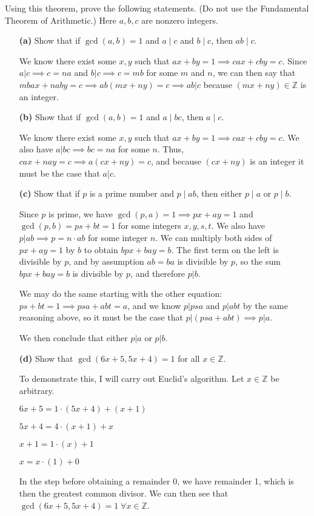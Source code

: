 \documentclass[12pt]{amsart}
\def\ZZ{{\mathbb Z}}
\begin{document}
Using this theorem, prove the following statements. (Do not use the Fundamental Theorem of Arithmetic.)  Here $a,b,c$ are nonzero integers.
\begin{itemize}
	\item[{\bf (a)}]  Show that if $\gcd(a,b)=1$ and $a\mid c$ and $b\mid c$, then $ab\mid c$.
	
	\medskip
	
	We know there exist some $x, y$ such that $ax + by = 1 \implies cax + cby = c$. Since $a|c \implies c = na$ and $b | c \implies c = mb$ for some $m$ and $n$, we can then say that $mbax + naby = c \implies ab(mx + ny) = c \implies ab | c$ because $(mx+ny)\in\ZZ$ is an integer. 	
	
	\medskip	
	
	
	\item[{\bf (b)}]  Show that if $\gcd(a,b)=1$ and $a\mid bc$, then $a\mid c$. 
	\medskip
	
	We know there exist some $x, y$ such that $ax + by = 1 \implies cax + cby = c$. We also have $a | bc \implies bc = na$ for some $n$. Thus, $cax + nay = c \implies a(cx + ny) = c$, and because $(cx + ny)$ is an integer it must be the case that $a | c$.
	
	\medskip	
	\item[{\bf (c)}]  Show that if $p$ is a prime number and $p\mid ab$, then either $p\mid a$ or $p\mid b$. 
	\medskip
	
	Since $p$ is prime, we have $\gcd(p, a) = 1 \implies px + ay = 1$ and $\gcd(p, b) = ps + bt = 1$ for some integers $x, y, s, t$. We also have $p | ab \implies p=n\cdot ab$ for some integer $n$. We can multiply both sides of $px + ay = 1$ by $b$ to obtain $bpx + bay = b$. The first term on the left is divisible by $p$, and by assumption $ab = ba$ is divisible by $p$, so the sum $bpx + bay = b$ is divisible by $p$, and therefore $p | b$. 
	
	We may do the same starting with the other equation: $ps + bt = 1 \implies psa + abt = a$, and we know $p | psa$ and $p | abt$ by the same reasoning above, so it must be the case that $p | (psa + abt) \implies p | a$.
	
	We then conclude that either $p|a$ or $p|b$.
	 
	\medskip	
	
	\item[{\bf (d)}]  Show that $\gcd(6x+5,5x+4)=1$ for all $x\in\ZZ$. 
	
	\medskip
	
	To demonstrate this, I will carry out Euclid's algorithm. Let $x\in\ZZ$ be arbitrary.
	
	$6x + 5=1\cdot(5x+4)+(x + 1)$
	
	$5x + 4 = 4\cdot(x+1) + x$
	
	$x+1=1\cdot(x)+1$
	
	$x=x\cdot(1)+0$
	
	
	In the step before obtaining a remainder 0, we have remainder 1, which is then the greatest common divisor. We can then see that $\gcd(6x+5,5x+4)=1 \; \forall x\in\ZZ$.
	
	\medskip	
	
	
\end{itemize}
\end{document}

